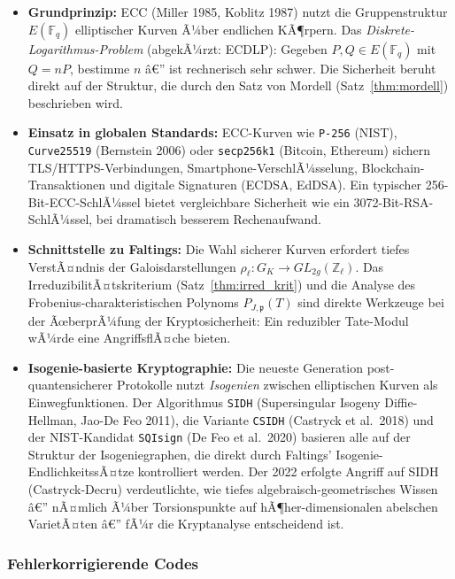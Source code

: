 ﻿\documentclass[12pt,a4paper]{article}
\theoremstyle{plain}
\theoremstyle{definition}
\theoremstyle{remark}
\newcommand{\Z}{\mathbb{Z}}
\newcommand{\F}{\mathbb{F}}
\begin{document}
\begin{itemize}[leftmargin=2em,itemsep=4pt]
  \item \textbf{Grundprinzip:}
    ECC (Miller 1985, Koblitz 1987) nutzt die Gruppenstruktur $E(\F_q)$
    elliptischer Kurven Ã¼ber endlichen KÃ¶rpern. Das \emph{Diskrete-Logarithmus-Problem}
    (abgekÃ¼rzt: ECDLP): Gegeben $P, Q \in E(\F_q)$ mit $Q = nP$, bestimme $n$ â€” ist rechnerisch
    sehr schwer. Die Sicherheit beruht direkt auf der Struktur, die durch den
    Satz von Mordell (Satz~\ref{thm:mordell}) beschrieben wird.

  \item \textbf{Einsatz in globalen Standards:}
    ECC-Kurven wie \texttt{P-256} (NIST), \texttt{Curve25519} (Bernstein 2006)
    oder \texttt{secp256k1} (Bitcoin, Ethereum) sichern
    TLS/HTTPS-Verbin\-dungen, Smartphone-VerschlÃ¼sselung, Blockchain-Transaktionen
    und digitale Signaturen (ECDSA, EdDSA).
    Ein typischer 256-Bit-ECC-SchlÃ¼ssel bietet vergleichbare Sicherheit wie ein
    3072-Bit-RSA-SchlÃ¼ssel, bei dramatisch besserem Rechenaufwand.

  \item \textbf{Schnittstelle zu Faltings:}
    Die Wahl sicherer Kurven erfordert tiefes VerstÃ¤ndnis der Galoisdarstellungen
    $\rho_\ell: G_K \to GL_{2g}(\Z_\ell)$. Das IrreduzibilitÃ¤tskriterium
    (Satz~\ref{thm:irred_krit}) und die Analyse des Frobenius-charakteristischen Polynoms
    $P_{J,\mathfrak p}(T)$ sind direkte Werkzeuge bei der ÃœberprÃ¼fung der
    Kryptosicherheit: Ein reduzibler Tate-Modul wÃ¼rde eine AngriffsflÃ¤che bieten.

  \item \textbf{Isogenie-basierte Kryptographie:}
    Die neueste Generation post-quantensicherer Protokolle nutzt \emph{Isogenien}
    zwischen elliptischen Kurven als Einwegfunktionen. Der Algorithmus
    \texttt{SIDH} (Supersingular Isogeny Diffie-Hellman, Jao-De Feo 2011),
    die Variante \texttt{CSIDH} (Castryck et al.\ 2018) und der NIST-Kandidat
    \texttt{SQIsign} (De Feo et al.\ 2020) basieren alle auf der Struktur
    der Isogeniegraphen, die direkt durch Faltings' Isogenie-EndlichkeitssÃ¤tze
    kontrolliert werden. Der 2022 erfolgte Angriff auf SIDH (Castryck-Decru)
    verdeutlichte, wie tiefes algebraisch-geometrisches Wissen â€” nÃ¤mlich Ã¼ber
    Torsionspunkte auf hÃ¶her-dimensionalen abelschen VarietÃ¤ten â€” fÃ¼r die
    Kryptanalyse entscheidend ist.
\end{itemize}

\subsubsection{Fehlerkorrigierende Codes}
\end{document}
